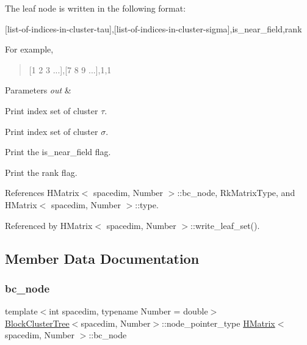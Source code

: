 The leaf node is written in the following format\+:

\begin{quote}


\end{quote}
\mbox{[}list-\/of-\/indices-\/in-\/cluster-\/tau\mbox{]},\mbox{[}list-\/of-\/indices-\/in-\/cluster-\/sigma\mbox{]},is\+\_\+near\+\_\+field,rank

For example,

\begin{quote}
\mbox{[}1 2 3 ...\mbox{]},\mbox{[}7 8 9 ...\mbox{]},1,1 \end{quote}



\begin{DoxyParams}{Parameters}
{\em out} & \\
\hline
\end{DoxyParams}
Print index set of cluster $\tau$.

Print index set of cluster $\sigma$.

Print the {\ttfamily is\+\_\+near\+\_\+field} flag.

Print the {\ttfamily rank} flag.

References H\+Matrix$<$ spacedim, Number $>$\+::bc\+\_\+node, Rk\+Matrix\+Type, and H\+Matrix$<$ spacedim, Number $>$\+::type.



Referenced by H\+Matrix$<$ spacedim, Number $>$\+::write\+\_\+leaf\+\_\+set().



\subsection{Member Data Documentation}
\mbox{\label{classHMatrix_a4a304494c970b5b267be1d8459d51586}} 
\subsubsection{\texorpdfstring{bc\+\_\+node}{bc\_node}}
{\footnotesize\ttfamily template$<$int spacedim, typename Number = double$>$ \\
\hyperlink{classBlockClusterTree}{Block\+Cluster\+Tree}$<$spacedim, Number$>$\+::node\+\_\+pointer\+\_\+type \hyperlink{classHMatrix}{H\+Matrix}$<$ spacedim, Number $>$\+::bc\+\_\+node\hspace{0.3cm}{\ttfamily [private]}}

